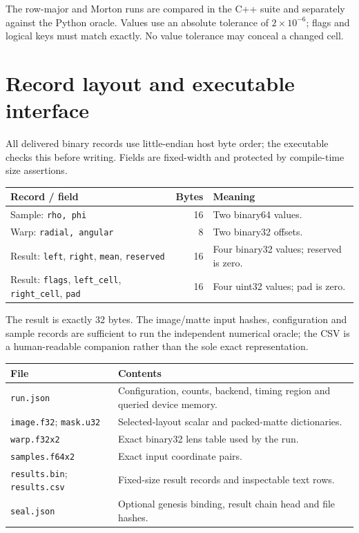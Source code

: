 \documentclass[11pt,a4paper]{article}
\newcommand{\code}[1]{\texttt{#1}}
\begin{document}
The row-major and Morton runs are compared in the C++ suite and separately against the Python oracle. Values use an absolute tolerance of $2\times10^{-6}$; flags and logical keys must match exactly. No value tolerance may conceal a changed cell.
\clearpage

\section{Record layout and executable interface}
All delivered binary records use little-endian host byte order; the executable checks this before writing. Fields are fixed-width and protected by compile-time size assertions.
\begin{center}
\begin{tabularx}{\textwidth}{@{}P{.31\textwidth}rY@{}}\toprule
\textbf{Record / field} & \textbf{Bytes} & \textbf{Meaning}\\\midrule
Sample: \code{rho, phi} & 16 & Two binary64 values.\\
Warp: \code{radial, angular} & 8 & Two binary32 offsets.\\
Result: \code{left}, \code{right}, \code{mean}, \code{reserved} & 16 & Four binary32 values; reserved is zero.\\
Result: \code{flags}, \code{left\_cell}, \code{right\_cell}, \code{pad} & 16 & Four uint32 values; pad is zero.\\\bottomrule
\end{tabularx}
\end{center}
The result is exactly 32 bytes. The image/matte input hashes, configuration and sample records are sufficient to run the independent numerical oracle; the CSV is a human-readable companion rather than the sole exact representation.

\small
\begin{tabularx}{\textwidth}{@{}P{.39\textwidth}Y@{}}\toprule
\textbf{File} & \textbf{Contents}\\\midrule
\code{run.json} & Configuration, counts, backend, timing region and queried device memory.\\
\code{image.f32}; \code{mask.u32} & Selected-layout scalar and packed-matte dictionaries.\\
\code{warp.f32x2} & Exact binary32 lens table used by the run.\\
\code{samples.f64x2} & Exact input coordinate pairs.\\
\code{results.bin}; \code{results.csv} & Fixed-size result records and inspectable text rows.\\
\code{seal.json} & Optional genesis binding, result chain head and file hashes.\\\bottomrule
\end{tabularx}
\par
\normalsize
\end{document}
